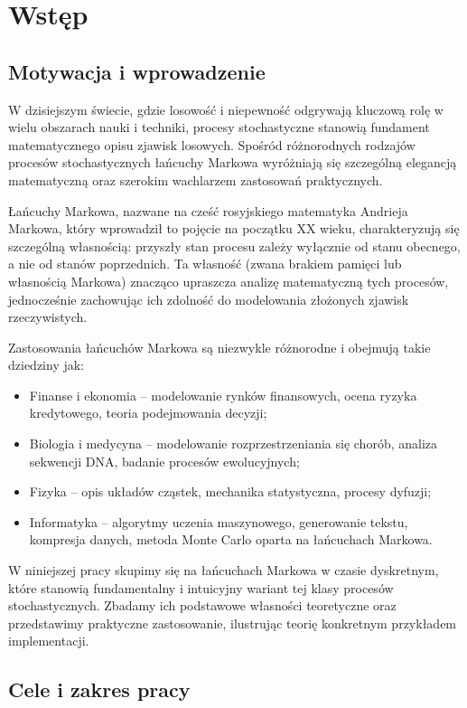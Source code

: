 \documentclass[final,a4paper,openany,12pt]{mwbk}
\begin{document}
\chapter{Wstęp}

\section{Motywacja i wprowadzenie}

W dzisiejszym świecie, gdzie losowość i niepewność odgrywają kluczową rolę w wielu obszarach nauki i techniki, procesy stochastyczne stanowią fundament matematycznego opisu zjawisk losowych. Spośród różnorodnych rodzajów procesów stochastycznych łańcuchy Markowa wyróżniają się szczególną elegancją matematyczną oraz szerokim wachlarzem zastosowań praktycznych.

Łańcuchy Markowa, nazwane na cześć rosyjskiego matematyka Andrieja Markowa, który wprowadził to pojęcie na początku XX wieku, charakteryzują się szczególną własnością: przyszły stan procesu zależy wyłącznie od stanu obecnego, a nie od stanów poprzednich. Ta własność (zwana brakiem pamięci lub własnością Markowa) znacząco upraszcza analizę matematyczną tych procesów, jednocześnie zachowując ich zdolność do modelowania złożonych zjawisk rzeczywistych.

Zastosowania łańcuchów Markowa są niezwykle różnorodne i obejmują takie dziedziny jak:
\begin{itemize}
    \item Finanse i ekonomia -- modelowanie rynków finansowych, ocena ryzyka kredytowego, teoria podejmowania decyzji;
    \item Biologia i medycyna -- modelowanie rozprzestrzeniania się chorób, analiza sekwencji DNA, badanie procesów ewolucyjnych;
    \item Fizyka -- opis układów cząstek, mechanika statystyczna, procesy dyfuzji;
    \item Informatyka -- algorytmy uczenia maszynowego, generowanie tekstu, kompresja danych, metoda Monte Carlo oparta na łańcuchach Markowa.
\end{itemize}

W niniejszej pracy skupimy się na łańcuchach Markowa w czasie dyskretnym, które stanowią fundamentalny i intuicyjny wariant tej klasy procesów stochastycznych. Zbadamy ich podstawowe własności teoretyczne oraz przedstawimy praktyczne zastosowanie, ilustrując teorię konkretnym przykładem implementacji.

\section{Cele i zakres pracy}
\end{document}
